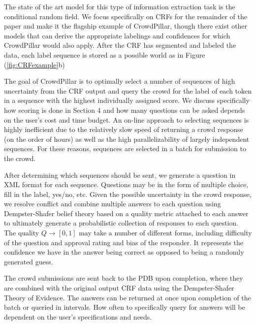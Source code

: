 The state of the art model for this type of information extraction task is the conditional random field.  We focus specifically on CRFs for the remainder of the paper and make it the flagship example of CrowdPillar, though there exist other models that can derive the appropriate labelings and confidences for which CrowdPillar would also apply.  After the CRF has segmented and labeled the data, each label sequence is stored as a possible world as in Figure (\ref{fig:CRFexample}b)

The goal of CrowdPillar is to optimally select a number of sequences of high uncertainty from the CRF output and query the crowd for the label of each token in a sequence with the highest individually assigned score.  We discuss specifically how scoring is done in Section 4 and how many questions can be asked depends on the user's cost and time budget.  An on-line approach to selecting sequences is highly inefficient due to the relatively slow speed of returning a crowd response (on the order of hours) as well as the high parallelizability of largely independent sequences.  For these reasons, sequences are selected in a batch for submission to the crowd.

After determining which sequences should be sent, we generate a question in XML format for each sequence.  Questions may be in the form of multiple choice, fill in the label, yes/no, etc.  Given the possible uncertainty in the crowd response, we resolve conflict and combine multiple answers to each question using Dempster-Shafer belief theory based on a quality metric attached to each answer to ultimately generate a probabilistic collection of responses to each question.  The quality $Q\rightarrow[0,1]$ may take a number of different forms, including difficulty of the question and approval rating and bias of the responder.  It represents the confidence we have in the answer being correct as opposed to being a randomly generated guess.

The crowd submissions are sent back to the PDB upon completion, where they are combined with the original output CRF data using the Dempster-Shafer Theory of Evidence.  The answers can be returned at once upon completion of the batch or queried in intervals.  How often to specifically query for answers will be dependent on the user's specifications and needs. 

